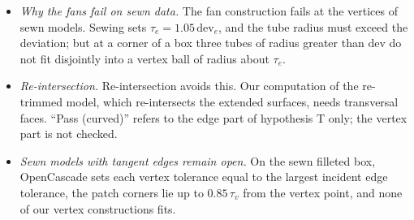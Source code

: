 \documentclass[preprint,12pt]{elsarticle}
\theoremstyle{definition}
\theoremstyle{remark}
\begin{document}
\begin{itemize}
\item \emph{Why the fans fail on sewn data.} The fan construction fails at the vertices of sewn models. Sewing sets
$\tau_e=1.05\,\mathrm{dev}_e$, and the tube radius must exceed the deviation; but at a corner of a box three tubes of
radius greater than $\mathrm{dev}$ do not fit disjointly into a vertex ball of radius about $\tau_e$.
\item \emph{Re-intersection.} Re-intersection avoids this. Our computation of the re-trimmed model, which
re-intersects the extended surfaces, needs transversal faces. ``Pass (curved)'' refers to the edge part of hypothesis T
only; the vertex part is not checked.
\item \emph{Sewn models with tangent edges remain open.} On the sewn filleted box, OpenCascade sets each vertex
tolerance equal to the largest incident edge tolerance, the patch corners lie up to $0.85\,\tau_v$ from the vertex
point, and none of our vertex constructions fits.
\end{itemize}
\end{document}
